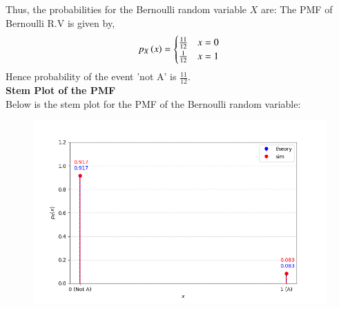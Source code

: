 \documentclass[journal,12pt,onecolumn]{IEEEtran}
\theoremstyle{remark}
\begin{document}
Thus, the probabilities for the Bernoulli random variable $ X $ are:
The PMF of Bernoulli R.V is given by,
\begin{align}
  p_X\left(x\right) = \begin{cases}
    \frac{11}{12} & x = 0\\
    \frac{1}{12} & x = 1
  \end{cases}
\end{align}
Hence probability of the event 'not A' is $\frac{11}{12}$.\\
\textbf{Stem Plot of the PMF}\\
Below is the stem plot for the PMF of the Bernoulli random variable:
\begin{figure}[h]
    \centering
    \includegraphics[width=\columnwidth]{figs/fig.png}
 \end{figure}
\end{document}
